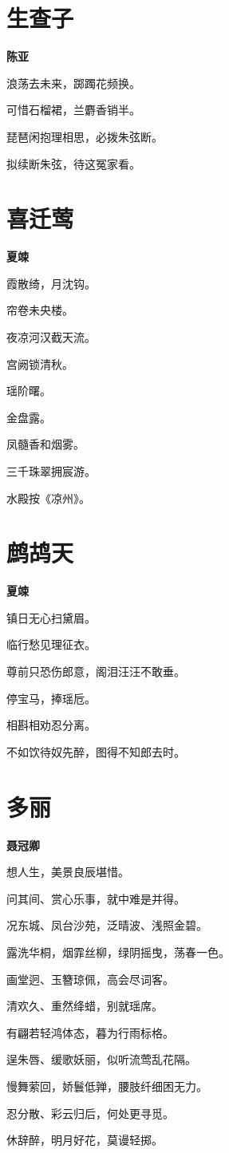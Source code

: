 \documentclass[12pt,a4paper]{ctexbook}
\begin{document}
\section{生查子}
\textbf{陈亚}\par\vspace{0.5em}
浪荡去未来，踯躅花频换。\par
可惜石榴裙，兰麝香销半。\par
琵琶闲抱理相思，必拨朱弦断。\par
拟续断朱弦，待这冤家看。\par

\section{喜迁莺}
\textbf{夏竦}\par\vspace{0.5em}
霞散绮，月沈钩。\par
帘卷未央楼。\par
夜凉河汉截天流。\par
宫阙锁清秋。\par
瑶阶曙。\par
金盘露。\par
凤髓香和烟雾。\par
三千珠翠拥宸游。\par
水殿按《凉州》。\par

\section{鹧鸪天}
\textbf{夏竦}\par\vspace{0.5em}
镇日无心扫黛眉。\par
临行愁见理征衣。\par
尊前只恐伤郎意，阁泪汪汪不敢垂。\par
停宝马，捧瑶卮。\par
相斟相劝忍分离。\par
不如饮待奴先醉，图得不知郎去时。\par

\section{多丽}
\textbf{聂冠卿}\par\vspace{0.5em}
想人生，美景良辰堪惜。\par
问其间、赏心乐事，就中难是并得。\par
况东城、凤台沙苑，泛晴波、浅照金碧。\par
露洗华桐，烟霏丝柳，绿阴摇曳，荡春一色。\par
画堂迥、玉簪琼佩，高会尽词客。\par
清欢久、重然绛蜡，别就瑶席。\par
有翩若轻鸿体态，暮为行雨标格。\par
逞朱唇、缓歌妖丽，似听流莺乱花隔。\par
慢舞萦回，娇鬟低亸，腰肢纤细困无力。\par
忍分散、彩云归后，何处更寻觅。\par
休辞醉，明月好花，莫谩轻掷。\par
\end{document}

